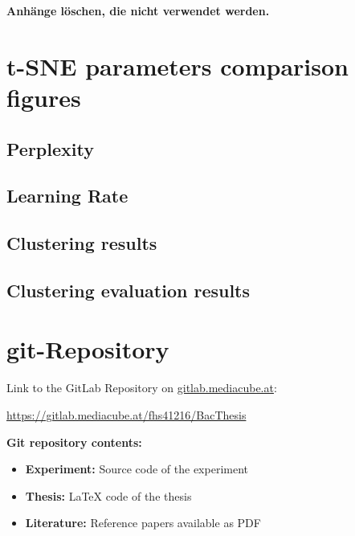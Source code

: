 \begin{appendices}
\textbf{\color{red} Anhänge löschen, die nicht verwendet werden.}

\section{t-SNE parameters comparison figures}
\label{appendix:tSNEParameters}
\subsection{Perplexity}
\label{appendix:tSNEParametersPerplexity}


\subsection{Learning Rate}
\label{appendix:tSNEParametersLearningRate}



\subsection{Clustering results}
\label{appendix:clusteringResults}

% 

\subsection{Clustering evaluation results}
\label{appendix:clusteringEvaluationResults}










\section{git-Repository}



Link to the GitLab Repository on {\url{gitlab.mediacube.at}}:

{\color{red}\url{https://gitlab.mediacube.at/fhs41216/BacThesis}}

\textbf{Git repository contents:}

\begin{itemize}
	\item \textbf{Experiment:} Source code of the experiment
	\item \textbf{Thesis:} LaTeX code of the thesis
	\item \textbf{Literature:} Reference papers available as PDF
\end{itemize}




\end{appendices}
